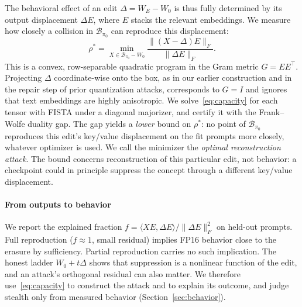 \documentclass[conference]{IEEEtran}
\begin{document}
The behavioral effect of an edit $\Delta=W_E-W_0$ is thus fully determined by its
output displacement $\Delta E$, where $E$ stacks the relevant embeddings. We measure
how closely a collision in $\mathcal{B}_{\pi_0}$ can reproduce this displacement:
\begin{equation}
 \rho^*=\min_{X\in\mathcal{B}_{\pi_0}-W_0}\frac{\|(X-\Delta)E\|_F}{\|\Delta E\|_F}.
 \label{eq:capacity}
\end{equation}
This is a convex, row-separable quadratic program in the Gram metric $G=EE^\top$.
Projecting $\Delta$ coordinate-wise onto the box, as in our earlier construction and
in the repair step of prior quantization attacks, corresponds to $G=I$ and ignores
that text embeddings are highly anisotropic. We solve~\eqref{eq:capacity} for each
tensor with FISTA under a diagonal majorizer, and certify it with the Frank--Wolfe
duality gap. The gap yields a \emph{lower} bound on $\rho^*$: no point of
$\mathcal{B}_{\pi_0}$ reproduces this edit's key/value displacement on the fit prompts
more closely, whatever optimizer is used. We call the minimizer the \emph{optimal
reconstruction attack}. The bound concerns reconstruction of this particular edit, not
behavior: a checkpoint could in principle suppress the concept through a different
key/value displacement.

\paragraph{From outputs to behavior}
We report the explained fraction $f=\langle XE,\Delta E\rangle/\|\Delta E\|_F^2$ on
held-out prompts. Full reproduction ($f\approx1$, small residual) implies FP16
behavior close to the erasure by sufficiency. Partial reproduction carries no such
implication. The honest ladder $W_0+t\Delta$ shows that suppression is a nonlinear
function of the edit, and an attack's orthogonal residual can also matter. We
therefore use~\eqref{eq:capacity} to construct the attack and to explain its outcome,
and judge stealth only from measured behavior (Section~\ref{sec:behavior}).
\end{document}
